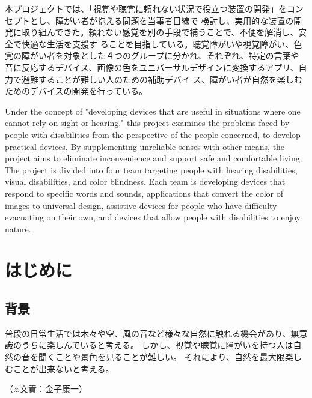 \documentclass[12pt,a4paper]{report}
\newcommand{\Writer}[1]{
  \normalsize
  \begin{flushright}
    （※文責：#1）
  \end{flushright}
}
\begin{document}
{
    \centerline{
      \huge{}
    }
    \vspace{1cm}
    \noindent
    \space 本プロジェクトでは、「視覚や聴覚に頼れない状況で役立つ装置の開発」をコンセプトとし、障がい者が抱える問題を当事者目線で
検討し、実用的な装置の開発に取り組んできた。頼れない感覚を別の手段で補うことで、不便を解消し、安全で快適な生活を支援す
ることを目指している。聴覚障がいや視覚障がい、色覚の障がい者を対象とした４つのグループに分かれ、それぞれ、特定の言葉や
音に反応するデバイス、画像の色をユニバーサルデザインに変換するアプリ、自力で避難することが難しい人のための補助デバイ
ス、障がい者が自然を楽しむためのデバイスの開発を行っている。

}
\newpage
{
    \centerline{
      \textbf{\huge{}}
    }
    \vspace{1cm}
    \noindent
    \space Under the concept of "developing devices that are useful in situations where one cannot rely on sight or hearing," this project examines the
problems faced by people with disabilities from the perspective of the people concerned, to develop practical devices. By supplementing
unreliable senses with other means, the project aims to eliminate inconvenience and support safe and comfortable living. The project is
divided into four team targeting people with hearing disabilities, visual disabilities, and color blindness. Each team is developing devices that
respond to specific words and sounds, applications that convert the color of images to universal design, assistive devices for people who
have difficulty evacuating on their own, and devices that allow people with disabilities to enjoy nature.

}
\newpage

\tableofcontents %
\newpage

\pagestyle{fancy}
\fancyhead{} %

\chapter{はじめに}
\section{背景}
\noindent\space
普段の日常生活では木々や空、風の音など様々な自然に触れる機会があり、無意識のうちに楽しんでいると考える。
しかし、視覚や聴覚に障がいを持つ人は自然の音を聞くことや景色を見ることが難しい。
それにより、自然を最大限楽しむことが出来ないと考える。
\Writer{金子康一}
\end{document}
